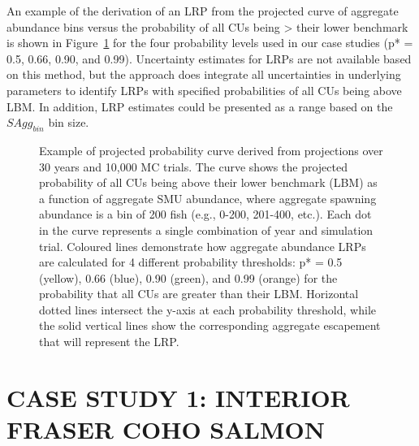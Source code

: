 \documentclass[11pt]{book}
\begin{document}
An example of the derivation of an LRP from the projected curve of aggregate abundance bins versus the probability of all CUs being \textgreater{} their lower benchmark is shown in Figure~\ref{fig:example-projectedCurve} for the four probability levels used in our case studies (p* = 0.5, 0.66, 0.90, and 0.99). Uncertainty estimates for LRPs are not available based on this method, but the approach does integrate all uncertainties in underlying parameters to identify LRPs with specified probabilities of all CUs being above LBM. In addition, LRP estimates could be presented as a range based on the \(SAgg_{bin}\) bin size.
\begin{figure}[htb]

{\centering {} 

}

\caption{Example of projected probability curve derived from projections over 30 years and 10,000 MC trials.  The curve shows the projected probability of all CUs being above their lower benchmark (LBM) as a function of aggregate SMU abundance, where aggregate spawning abundance is a bin of 200 fish (e.g., 0-200, 201-400, etc.). Each dot in the curve represents a single combination of year and simulation trial. Coloured lines demonstrate how aggregate abundance LRPs are calculated for 4 different probability thresholds: p* = 0.5 (yellow), 0.66 (blue), 0.90 (green), and 0.99 (orange) for the probability that all CUs are greater than their LBM. Horizontal dotted lines intersect the y-axis at each probability threshold, while the solid vertical lines show the corresponding aggregate escapement that will represent the LRP.}\label{fig:example-projectedCurve}
\end{figure}
\hypertarget{IFCChapter}{%
\section{CASE STUDY 1: INTERIOR FRASER COHO SALMON}\label{IFCChapter}}
\end{document}
